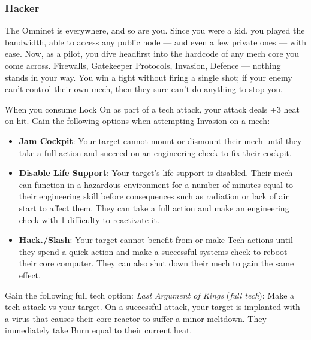 \subsubsection{Hacker}

\begin{talent}
{The Omninet is everywhere, and so are you. Since you were a kid, you played the bandwidth, able to access any public node — and even a few private ones — with ease. Now, as a pilot, you dive headfirst into the hardcode of any mech core you come across. Firewalls, Gatekeeper Protocols, Invasion, Defence — nothing stands in your way. You win a fight without firing a single shot; if your enemy can't control their own mech, then they sure can't do anything to stop you.}

When you consume Lock On as part of a tech attack, your attack deals +3 heat on hit. 
Gain the following options when attempting Invasion on a mech: 
\begin{itemize}
\item \textbf{Jam Cockpit}: Your target cannot mount or dismount their mech until they take a full action and succeed on an engineering check to fix their cockpit.
\item \textbf{Disable Life Support}: Your target's life support is disabled. Their mech can function in a hazardous environment for a number of minutes equal to their engineering skill before consequences such as radiation or lack of air start to affect them. They can take a full action and make an engineering check with 1 difficulty to reactivate it.
\item \textbf{Hack./Slash}: Your target cannot benefit from or make Tech actions until they spend a quick action and make a successful systems check to reboot their core computer. They can also shut down their mech to gain the same effect.
\end{itemize}
Gain the following full tech option:\newline
\textit{Last Argument of Kings} (\textit{full tech}): Make a tech attack vs your target. On a successful attack, your target is implanted with a virus that causes their core reactor to suffer a minor meltdown. They immediately take Burn equal to their current heat.
\end{talent}
